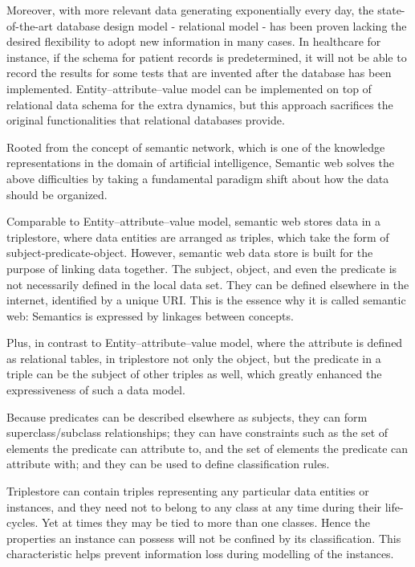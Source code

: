 \documentclass[12pt]{cls}
\begin{document}
Moreover, with more relevant data generating exponentially every day, the state-of-the-art database design model - relational model - has been proven lacking the desired flexibility to adopt new information in many cases. In healthcare for instance, if the schema for patient records is predetermined, it will not be able to record the results for some tests that are invented after the database has been implemented. Entity–attribute–value model can be implemented on top of relational data schema for the extra dynamics, but this approach sacrifices the original functionalities that relational databases provide.

Rooted from the concept of semantic network, which is one of the knowledge representations in the domain of artificial intelligence, Semantic web solves the above difficulties by taking a fundamental paradigm shift about how the data should be organized.

Comparable to Entity–attribute–value model, semantic web stores data in a triplestore, where data entities are arranged as triples, which take the form of subject-predicate-object. However, semantic web data store is built for the purpose of linking data together. The subject, object, and even the predicate is not necessarily defined in the local data set. They can be defined elsewhere in the internet, identified by a unique URI. This is the essence why it is called semantic web: Semantics is expressed by linkages between concepts.

Plus, in contrast to Entity–attribute–value model, where the attribute is defined as relational tables, in triplestore not only the object, but the predicate in a triple can be the subject of other triples as well, which greatly enhanced the expressiveness of such a data model.

Because predicates can be described elsewhere as subjects, they can form superclass/subclass relationships; they can have constraints such as the set of elements the predicate can attribute to, and the set of elements the predicate can attribute with; and they can be used to define classification rules.

Triplestore can contain triples representing any particular data entities or instances, and they need not to belong to any class at any time during their life-cycles. Yet at times they may be tied to more than one classes. Hence the properties an instance can possess will not be confined by its classification. This characteristic helps prevent information loss during modelling of the instances.
\end{document}
